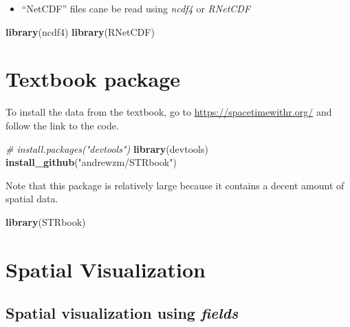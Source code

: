 \documentclass[]{book}
\newenvironment{Shaded}{\begin{snugshade}}{\end{snugshade}}
\newcommand{\CommentTok}[1]{\textcolor[rgb]{0.56,0.35,0.01}{\textit{#1}}}
\newcommand{\KeywordTok}[1]{\textcolor[rgb]{0.13,0.29,0.53}{\textbf{#1}}}
\newcommand{\NormalTok}[1]{#1}
\newcommand{\StringTok}[1]{\textcolor[rgb]{0.31,0.60,0.02}{#1}}
\providecommand{\tightlist}{%
  \setlength{\itemsep}{0pt}\setlength{\parskip}{0pt}}
\begin{document}
\begin{itemize}
\tightlist
\item
  ``NetCDF'' files cane be read using \emph{ncdf4} or \emph{RNetCDF}
\end{itemize}

\begin{Shaded}
\begin{Highlighting}[]
\KeywordTok{library}\NormalTok{(ncdf4)}
\KeywordTok{library}\NormalTok{(RNetCDF)}
\end{Highlighting}
\end{Shaded}

\hypertarget{textbook-package}{%
\section{Textbook package}\label{textbook-package}}

To install the data from the textbook, go to \url{https://spacetimewithr.org/} and follow the link to the code.

\begin{Shaded}
\begin{Highlighting}[]
\CommentTok{# install.packages("devtools")}
\KeywordTok{library}\NormalTok{(devtools)}
\KeywordTok{install_github}\NormalTok{(}\StringTok{"andrewzm/STRbook"}\NormalTok{)}
\end{Highlighting}
\end{Shaded}

Note that this package is relatively large because it contains a decent amount of spatial data.

\begin{Shaded}
\begin{Highlighting}[]
\KeywordTok{library}\NormalTok{(STRbook)}
\end{Highlighting}
\end{Shaded}

\hypertarget{spatial-visualization}{%
\section{Spatial Visualization}\label{spatial-visualization}}

\hypertarget{spatial-visualization-using-fields}{%
\subsection{\texorpdfstring{Spatial visualization using \emph{fields}}{Spatial visualization using fields}}\label{spatial-visualization-using-fields}}
\end{document}
